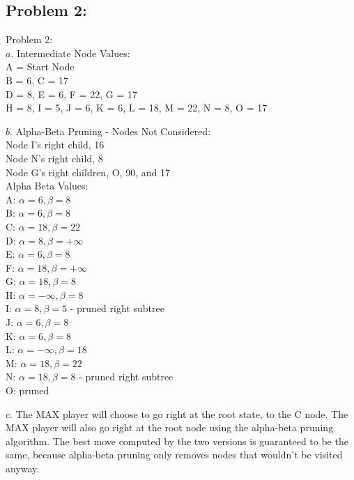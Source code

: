 \documentclass[11pt, oneside]{article}   	%
\begin{document}
\begin{flushleft}
\section*{Problem 2:}


Problem 2: \\
$a$. Intermediate Node Values:\\
A = Start Node \\
B = 6, C = 17 \\
D = 8, E = 6, F = 22, G = 17 \\
H = 8, I = 5, J = 6, K = 6, L = 18, M = 22, N = 8, O = 17 \\\medskip

$b$. Alpha-Beta Pruning - Nodes Not Considered:\\
Node I's right child, 16\\
Node N's right child, 8\\
Node G's right children, O, 90, and 17\\\medskip
Alpha Beta Values:\\
A: $\alpha = 6, \beta = 8$\\
B: $\alpha = 6, \beta = 8$ \\
C: $\alpha = 18, \beta = 22$ \\
D: $\alpha = 8, \beta = +\infty$ \\
E: $\alpha = 6, \beta = 8$ \\
F: $\alpha = 18, \beta = +\infty$ \\
G: $\alpha = 18, \beta = 8$ \\
H: $\alpha = -\infty, \beta = 8$ \\
I: $\alpha = 8, \beta = 5$ - pruned right subtree\\
J: $\alpha = 6, \beta = 8$ \\
K: $\alpha = 6, \beta = 8$ \\
L: $\alpha = -\infty, \beta = 18$ \\
M: $\alpha = 18, \beta = 22$ \\
N: $\alpha = 18, \beta = 8$ - pruned right subtree\\
O: pruned \\\medskip

$c$. The MAX player will choose to go right at the root state, to the C node. The MAX player will also go right at the root node using the alpha-beta pruning algorithm. The best move computed by the two versions is guaranteed to be the same, because alpha-beta pruning only removes nodes that wouldn't be visited anyway.\\\medskip


\end{flushleft}
\end{document}
